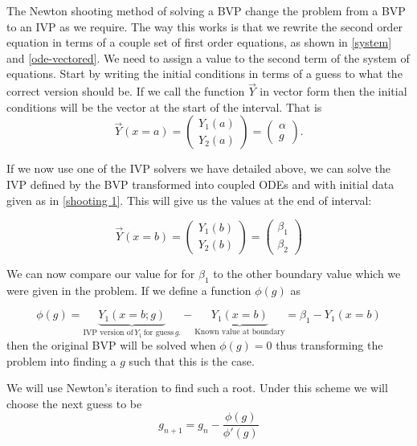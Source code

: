\documentclass[a4paper,11pt]{report}
\begin{document}
The Newton shooting method of solving a BVP change the problem from a BVP to an IVP as we require. The way this works is that we rewrite the second order equation in terms of a couple set of first order equations, as shown in \ref{system} and \ref{ode-vectored}. We need to assign a value to the second term of the system of equations. Start by writing the initial conditions in terms of a guess to what the correct version should be. If we call the function $\vec{Y}$ in vector form then the initial conditions will be the vector at the start of the interval. That is
\begin{equation} \label{shooting 1}
	\vec{Y}(x=a) = \begin{pmatrix} Y_{1} (a) \\ Y_2 (a) \end{pmatrix} = \begin{pmatrix} \alpha \\ g \end{pmatrix} .
\end{equation}

If we now use one of the IVP solvers we have detailed above, we can solve the IVP defined by the BVP transformed into coupled ODEs and with initial data given as in \ref{shooting 1}. This will give us the values at the end of interval:

\begin{equation} \label{shooting 2}
	\vec{Y}(x=b) = \begin{pmatrix} Y_{1} (b) \\ Y_2 (b) \end{pmatrix} = \begin{pmatrix} \beta_1 \\ \beta_2 \end{pmatrix}
\end{equation}

We can now compare our value for for $\beta_1$ to the other boundary value which we were given in the problem. If we define a function $\phi(g)$ as

\begin{equation} \label{phi}
	\phi(g) = \underbrace{Y_1 (x=b;g)}_{\text{IVP version of} \, Y_1 \, \text{for guess} \, g .} - \underbrace{Y_1 (x=b)}_{\text{Known value at boundary}} = \beta_1 - Y_1 (x = b)
\end{equation}
then the original BVP will be solved when $\phi(g) = 0$ thus transforming the problem into finding a $g$ such that this is the case.

We will use Newton's iteration to find such a root. Under this scheme we will choose the next guess to be
\begin{equation} \label{newton-guess}
	g_{n+1} = g_n - \frac{\phi(g)}{\phi'(g)}
\end{equation}
\end{document}
